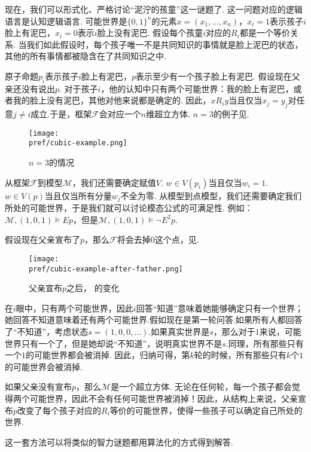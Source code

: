 现在，我们可以形式化、严格讨论“泥泞的孩童”这一谜题了. 这一问题对应的逻辑语言是认知逻辑语言. 可能世界是$\{0,1\}^n$的元素$x=(x_1,\dots,x_n)$，$x_i=1$表示孩子$i$脸上有泥巴，$x_i=0$表示$i$脸上没有泥巴. 假设每个孩童$i$对应的$R_i$都是一个等价关系. 当我们如此假设时，每个孩子唯一不是共同知识的事情就是脸上泥巴的状态，其他的所有事情都被隐含在了共同知识之中.

原子命题$p_i$表示孩子$i$脸上有泥巴，$p$表示至少有一个孩子脸上有泥巴. 假设现在父亲还没有说出$p$. 对于孩子$i$，他的认知中只有两个可能世界：我的脸上有泥巴，或者我的脸上没有泥巴，其他对他来说都是确定的. 因此，$x R_i y$当且仅当$x_j=y_j$对任意$j\neq i$成立.于是，框架$\mathcal F$会对应一个$n$维超立方体. $n=3$的例子见.

\begin{figure}[ht]
    \centering
    \texttt{[image: \\pref/cubic-example.png]}
    \caption{$n=3$的情况}
    \label{fig:cubic-example}
\end{figure}

从框架$\mathcal F$到模型$\mathcal M$，我们还需要确定赋值$V$. $w\in V(p_i)$当且仅当$w_i=1$. $w\in V(p)$当且仅当所有分量$w_j$不全为零. 从模型到点模型，我们还需要确定我们所处的可能世界，于是我们就可以讨论模态公式的可满足性. 例如：$\mathcal M,(1,0,1)\vDash Ep$，但是$\mathcal M,(1,0,1)\vDash \neg E^2p$. 

假设现在父亲宣布了$p$，那么$\mathcal F$将会去掉$0$这个点，见. 
\begin{figure}[ht]
    \centering
    \texttt{[image: \\pref/cubic-example-after-father.png]}
    \caption{父亲宣布$p$之后， 的变化}
    \label{fig:cubic-example-after-father}
\end{figure}


 在$i$眼中，只有两个可能世界，因此$i$回答“知道”意味着她能够确定只有一个世界；她回答不知道意味着还有两个可能世界.假如现在是第一轮问答.如果所有人都回答了“不知道”，考虑状态$s=(1,0,0,\dots)$.如果真实世界是$s$，那么对于$1$来说，可能世界只有一个了，但是她却说“不知道”，说明真实世界不是$s$.同理，所有那些只有一个$1$的可能世界都会被消掉. 因此，归纳可得，第$k$轮的时候，所有那些只有$k$个$1$的可能世界会被消掉.
 
 如果父亲没有宣布$p$，那么$\mathcal M$是一个超立方体. 无论在任何轮，每一个孩子都会觉得两个可能世界，因此不会有任何可能世界被消掉！因此，从结构上来说，父亲宣布$p$改变了每个孩子对应的$R_i$等价的可能世界，使得一些孩子可以确定自己所处的世界. 
 
这一套方法可以将类似的智力谜题都用算法化的方式得到解答.

